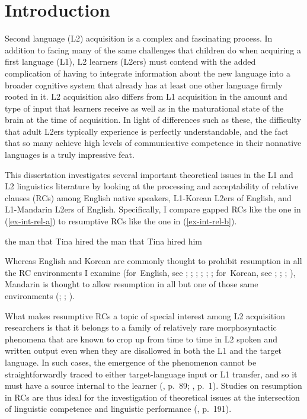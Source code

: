 
\chapter{Introduction}\label{ch-introduction}

Second language (L2) acquisition is a complex and fascinating process. In addition to facing many of the same challenges that children do when acquiring a first language (L1), L2 learners (L2ers) must contend with the added complication of having to integrate information about the new language into a broader cognitive system that already has at least one other language firmly rooted in it. L2 acquisition also differs from L1 acquisition in the amount and type of input that learners receive as well as in the maturational state of the brain at the time of acquisition. In light of differences such as these, the difficulty that adult L2ers typically experience is perfectly understandable, and the fact that so many achieve high levels of communicative competence in their nonnative languages is a truly impressive feat. 

This dissertation investigates several important theoretical issues in the L1 and L2 linguistics literature by looking at the processing and acceptability of relative clauses (RCs) among English native speakers, L1-Korean L2ers of English, and L1-Mandarin L2ers of English. Specifically, I compare gapped RCs like the one in (\ref{ex-int-rel-a}) to resumptive RCs like the one in (\ref{ex-int-rel-b}).

\pex
\a the man that Tina hired\label{ex-int-rel-a}
\a \ljudge*the man that Tina hired him\label{ex-int-rel-b}
\xe 

\noindent Whereas English and Korean are commonly thought to prohibit resumption in all the RC environments I examine (for~English, see \cite{beltrama.xiang2016}; \cite{han.etal2012}; \cite{keffala.goodall2011}; \cite{mcdaniel.cowart1999}; \cite{omaki.nakao2010}; \cite{polinsky.etal2013}; for~Korean, see \cite{han2013}; \cite{keenan.comrie1977}; \cite{kim2013}; \cite{song2003}), Mandarin is thought to allow resumption in all but one of those same environments (\cite{keenan.comrie1977}; \cite{li.wei2014}; \cite{pan2016}).

What makes resumptive RCs a topic of special interest among L2 acquisition researchers is that it belongs to a family of relatively rare morphosyntactic phenomena that are known to crop up from time to time in L2 spoken and written output even when they are disallowed in both the L1 and the target language. In such cases, the emergence of the phenomenon cannot be straightforwardly traced to either target-language input or L1 transfer, and so it must have a source internal to the learner (\cite{eckman2004}, p.~89; \cite{schulz2006}, p.~1). Studies on resumption in RCs are thus ideal for the investigation of theoretical issues at the intersection of linguistic competence and linguistic performance (\cite{meltzer-asscher2021}, p.~191). 

